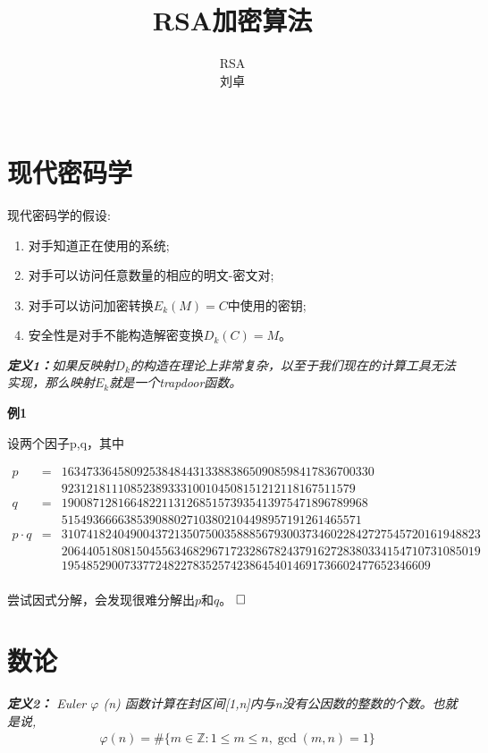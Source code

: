 \documentclass{article}
\date{}
\title{RSA加密算法}
\author{
RSA\\
 刘卓\\
 \texttt{ } \\
}
\begin{document}
\maketitle


\section{现代密码学}

现代密码学的假设:

\begin{enumerate}
\item 对手知道正在使用的系统;
\item 对手可以访问任意数量的相应的明文-密文对;
\item 对手可以访问加密转换$E_k(M) = C$中使用的密钥;
\item 安全性是对手不能构造解密变换$D_k(C) = M$。
\end{enumerate}

\textit{\textbf{定义1：}如果反映射$D_k$的构造在理论上非常复杂，以至于我们现在的计算工具无法实现，那么映射$E_k$就是一个trapdoor函数。}

\textbf{例1}

设两个因子p,q，其中

\begin{eqnarray}   
\label{eq}
p &=& 16347336458092538484431338838650908598417836700330 \nonumber \\ 
&&92312181110852389333100104508151212118167511579 \nonumber \\
q &=& 1900871281664822113126851573935413975471896789968 \nonumber \\ 
&&515493666638539088027103802104498957191261465571 \nonumber \\ 
p \cdot q &=&  3107418240490043721350750035888567930037346022842727545720161948823\nonumber \\ 
&&2064405180815045563468296717232867824379162728380334154710731085019  \nonumber \\ 
&&19548529007337724822783525742386454014691736602477652346609\nonumber \\ 
\nonumber 
\end{eqnarray}

尝试因式分解，会发现很难分解出$p$和$q$。
$\hfill\square$ 

\section{数论}

\textit{\textbf{定义2：} Euler $\varphi$ (n) 函数计算在封区间[1,n]内与n没有公因数的整数的个数。也就是说,}
$$
\begin{aligned}
&\varphi(n)=\#\{m \in \mathbb{Z}: 1 \leq m \leq n, \operatorname{gcd}(m, n)=1\}\\
\end{aligned}
$$
\end{document}
